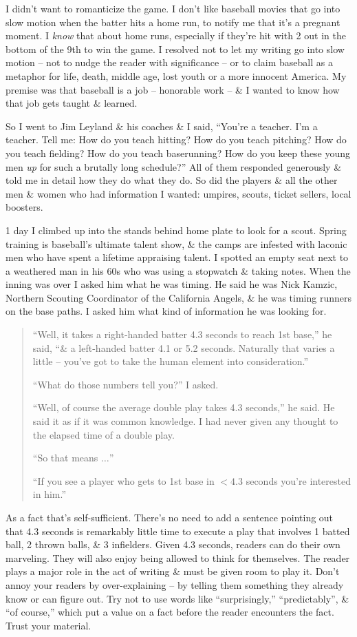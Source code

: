 \documentclass{article}
\begin{document}
I didn't want to romanticize the game. I don't like baseball movies that go into slow motion when the batter hits a home run, to notify me that it's a pregnant moment. I \textit{know} that about home runs, especially if they're hit with 2 out in the bottom of the 9th to win the game. I resolved not to let my writing go into slow motion -- not to nudge the reader with significance -- or to claim baseball as a metaphor for life, death, middle age, lost youth or a more innocent America. My premise was that baseball is a job -- honorable work -- \& I wanted to know how that job gets taught \& learned.

So I went to Jim Leyland \& his coaches \& I said, ``You're a teacher. I'm a teacher. Tell me: How do you teach hitting? How do you teach pitching? How do you teach fielding? How do you teach baserunning? How do you keep these young men \textit{up} for such a brutally long schedule?'' All of them responded generously \& told me in detail how they do what they do. So did the players \& all the other men \& women who had information I wanted: umpires, scouts, ticket sellers, local boosters.

1 day I climbed up into the stands behind home plate to look for a scout. Spring training is baseball's ultimate talent show, \& the camps are infested with laconic men who have spent a lifetime appraising talent. I spotted an empty seat next to a weathered man in his 60s who was using a stopwatch \& taking notes. When the inning was over I asked him what he was timing. He said he was Nick Kamzic, Northern Scouting Coordinator of the California Angels, \& he was timing runners on the base paths. I asked him what kind of information he was looking for.
\begin{quotation}
	``Well, it takes a right-handed batter 4.3 seconds to reach 1st base,'' he said, ``\& a left-handed batter 4.1 or 5.2 seconds. Naturally that varies a little -- you've got to take the human element into consideration.''

	``What do those numbers tell you?'' I asked.

	``Well, of course the average double play takes 4.3 seconds,'' he said. He said it as if it was common knowledge. I had never given any thought to the elapsed time of a double play.

	``So that means $\ldots$''

	``If you see a player who gets to 1st base in $< 4.3$ seconds you're interested in him.''
\end{quotation}
As a fact that's self-sufficient. There's no need to add a sentence pointing out that 4.3 seconds is remarkably little time to execute a play that involves 1 batted ball, 2 thrown balls, \& 3 infielders. Given 4.3 seconds, readers can do their own marveling. They will also enjoy being allowed to think for themselves. The reader plays a major role in the act of writing \& must be given room to play it. Don't annoy your readers by over-explaining -- by telling them something they already know or can figure out. Try not to use words like ``surprisingly,'' ``predictably'', \& ``of course,'' which put a value on a fact before the reader encounters the fact. Trust your material.
\end{document}
